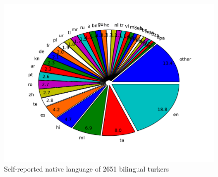 \documentclass[11pt]{article}
\begin{document}
\begin{figure}[h]
\centering
\includegraphics[width=7in]{figures/natlang-pie}
\caption{Self-reported native language of 2651 bilingual turkers}
\label{lang-pie}
\end{figure}
\end{document}
